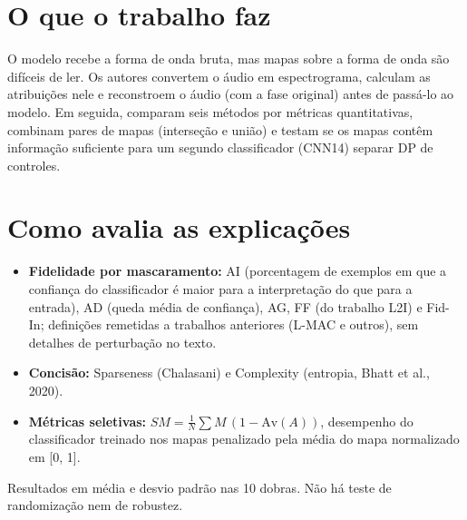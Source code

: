 \documentclass[11pt,a4paper]{article}
\begin{document}
\section{O que o trabalho faz}
O modelo recebe a forma de onda bruta, mas mapas sobre a forma de onda são difíceis de ler. Os autores convertem o áudio em espectrograma, calculam as atribuições nele e reconstroem o áudio (com a fase original) antes de passá-lo ao modelo. Em seguida, comparam seis métodos por métricas quantitativas, combinam pares de mapas (interseção e união) e testam se os mapas contêm informação suficiente para um segundo classificador (CNN14) separar DP de controles.

\section{Como avalia as explicações}
\begin{itemize}
\item \textbf{Fidelidade por mascaramento:} AI (porcentagem de exemplos em que a confiança do classificador é maior para a interpretação do que para a entrada), AD (queda média de confiança), AG, FF (do trabalho L2I) e Fid-In; definições remetidas a trabalhos anteriores (L-MAC e outros), sem detalhes de perturbação no texto.
\item \textbf{Concisão:} Sparseness (Chalasani) e Complexity (entropia, Bhatt et al., 2020).
\item \textbf{Métricas seletivas:} $SM = \frac{1}{N}\sum M\,(1 - \mathrm{Av}(A))$, desempenho do classificador treinado nos mapas penalizado pela média do mapa normalizado em [0, 1].
\end{itemize}
Resultados em média e desvio padrão nas 10 dobras. Não há teste de randomização nem de robustez.
\end{document}
